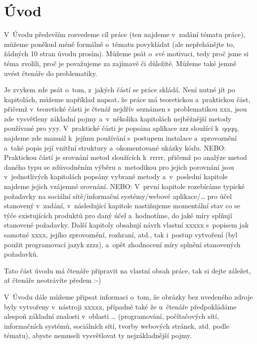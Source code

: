 \section*{Úvod}

V~Úvodu především rozvedeme cíl práce (ten najdeme v~zadání tématu práce), můžeme poněkud méně formálně o~tématu povykládat (ale nepřehánějte to, žádných 10 stran úvodu prosím). Můžeme psát o~své motivaci, tedy proč jsme si téma zvolili, proč je považujeme za zajímavé či důležité. Můžeme také jemně uvést čtenáře do problematiky.

Je zvykem zde psát o~tom, z~jakých částí se práce skládá. Není nutné jít po kapitolách, můžeme například napsat, že práce má teoretickou a~praktickou část, přičemž v~teoretické části je čtenář nejdřív seznámen s~problematikou xxx, jsou zde vysvětleny základní pojmy a~v~několika kapitolách nejběžnější metody používané pro yyy. V~praktické části je popsána aplikace zzz sloužící k~qqqq, najdeme zde manuál k~jejímu používání s~postupem instalace a~zprovoznění a~také popis její vnitřní struktury a~okomentované ukázky kódu. NEBO: Praktickou částí je srovnání metod sloužících k~rrrrr, přičemž po analýze metod daného typu se zdůvodněním výběru a~metodikou pro jejich porovnání jsou v~jednotlivých kapitolách popsány vybrané metody a~v~poslední kapitole najdeme jejich vzájemné srovnání. NEBO: V~první kapitole rozebíráme typické požadavky na sociální sítě/informační systémy/webové aplikace/… pro účel stanovený v~zadání, v~následující kapitole nastiňujeme momentální stav co se týče existujících produktů pro daný účel a~hodnotíme, do jaké míry splňují stanovené požadavky. Další kapitoly obsahují návrh vlastní xxxxx s~popisem jak samotné xxxx, jejího zprovoznění, rozhraní, atd., tak i~postup vytvoření (byl použit programovací jazyk zzzz), a~opět zhodnocení míry splnění stanovených požadavků.

Tato část úvodu má čtenáře připravit na vlastní obsah práce, tak si dejte záležet, ať čtenáře neotrávíte předem :-)

V~Úvodu dále můžeme připsat informaci o~tom, že obrázky bez uvedeného zdroje byly vytvořeny v~nástroji xxxxx, případně také že u~čtenáře předpokládáme alespoň základní znalosti v~oblasti \dots{} (programování, počítačových sítí, informačních systémů, sociálních sítí, tvorby webových stránek, atd. podle tématu), abyste nemuseli vysvětlovat ty nejzákladnější pojmy.

